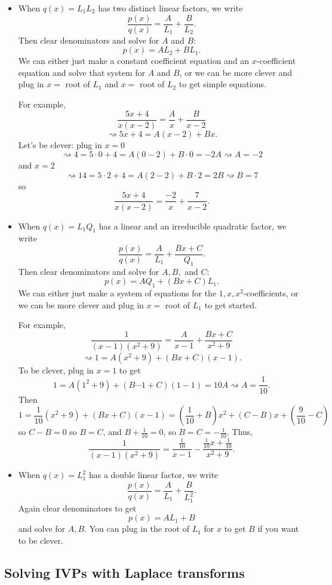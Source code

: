 \documentclass[12pt]{amsart}
\numberwithin{equation}{section}
\theoremstyle{plain} %
\newcommand{\rsa}{\rightsquigarrow}
\theoremstyle{definition}
\theoremstyle{remark}
\begin{document}
\begin{itemize}
\item When $q(x) = L_1 L_2$ has two distinct linear factors, we write
\[ \frac{p(x)}{q(x)} = \frac{A}{L_1} + \frac{B}{L_2}.\]
Then clear denominators and solve for $A$ and $B$:
\[ p(x) = A L_2 + B L_1.\]
We can either just make a constant coefficient equation and an $x$-coefficient equation and solve that system for $A$ and $B$, or we can be more clever and plug in $x=$ root of $L_1$ and $x=$ root of $L_2$ to get simple equations.

For example,
\[ \frac{5x+4}{x(x-2)} = \frac{A}{x} + \frac{B}{x-2}\]
\[\rsa 5x+4 = A(x-2) + Bx.\]
Let's be clever: plug in $x=0$
\[ \rsa 4 = 5\cdot 0 + 4 = A (0-2) + B \cdot 0 = -2A \rsa A=-2\]
and $x=2$
\[ \rsa 14 = 5 \cdot 2  + 4 = A (2-2) + B \cdot 2 = 2B \rsa B=7\]
so
\[ \frac{5x+4}{x(x-2)} = \frac{-2}{x} + \frac{7}{x-2}.\]

\item When $q(x) = L_1 Q_1$ has a linear and an irreducible quadratic factor, we write
\[ \frac{p(x)}{q(x)} = \frac{A}{L_1} + \frac{Bx+C}{Q_1}.\]
Then clear denominators and solve for $A,B,$ and $C$:
\[ p(x) = A Q_1 + (Bx+C) L_1.\]
We can either just make a system of equations for the $1,x,x^2$-coefficients, or we can be more clever and plug in $x=$ root of $L_1$ to get started.

For example,
\[ \frac{1}{(x-1)(x^2+9)}= \frac{A}{x-1} + \frac{Bx+C}{x^2+9}\]
\[ \rsa 1= A(x^2+9) + (Bx+C)(x-1).\]
To be clever, plug in $x=1$ to get
\[ 1 = A(1^2+9) + (B \cdots 1 + C) (1-1) = 10 A \rsa A=\frac{1}{10}.\]
Then 
\[1= \frac{1}{10}(x^2+9) + (Bx+C)(x-1) = (\frac{1}{10} + B) x^2 + (C-B) x + (\frac{9}{10} - C)\]
so $C-B=0$ so $B=C$, and $B+\frac{1}{10} = 0$, so $B=C=-\frac{1}{10}$. Thus,
\[\frac{1}{(x-1)(x^2+9)}= \frac{\frac{1}{10}}{x-1} - \frac{\frac{1}{10}x+\frac{1}{10}}{x^2+9}.\]

\item When $q(x)=L_1^2$ has a double linear factor,  we write
\[ \frac{p(x)}{q(x)} = \frac{A}{L_1} + \frac{B}{L_1^2}.\]
Again clear denominators to get
\[ p(x) = A L_1 + B\]
and solve for $A,B$. You can plug in the root of $L_1$ for $x$ to get  $B$ if you want to be clever.
\end{itemize}

\subsection*{Solving IVPs with Laplace transforms}
\end{document}
